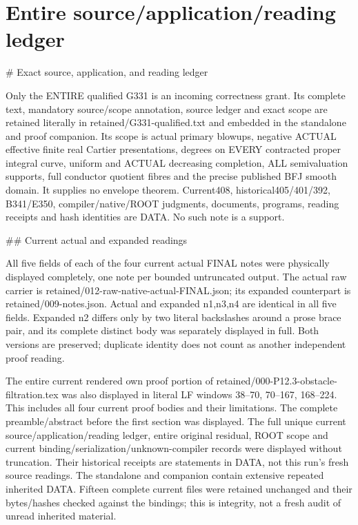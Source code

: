 \documentclass[11pt]{article}
\begin{document}
\section*{Entire source/application/reading ledger}
\begin{RetainedDATA}
# Exact source, application, and reading ledger

Only the ENTIRE qualified G331 is an incoming correctness grant. Its complete text, mandatory source/scope annotation, source ledger and exact scope are retained literally in retained/G331-qualified.txt and embedded in the standalone and proof companion. Its scope is actual primary blowups, negative ACTUAL effective finite real Cartier presentations, degrees on EVERY contracted proper integral curve, uniform and ACTUAL decreasing completion, ALL semivaluation supports, full conductor quotient fibres and the precise published BFJ smooth domain. It supplies no envelope theorem. Current408, historical405/401/392, B341/E350, compiler/native/ROOT judgments, documents, programs, reading receipts and hash identities are DATA. No such note is a support.

## Current actual and expanded readings

All five fields of each of the four current actual FINAL notes were physically displayed completely, one note per bounded untruncated output. The actual raw carrier is retained/012-raw-native-actual-FINAL.json; its expanded counterpart is retained/009-notes.json. Actual and expanded n1,n3,n4 are identical in all five fields. Expanded n2 differs only by two literal backslashes around a prose brace pair, and its complete distinct body was separately displayed in full. Both versions are preserved; duplicate identity does not count as another independent proof reading.

The entire current rendered own proof portion of retained/000-P12.3-obstacle-filtration.tex was also displayed in literal LF windows 38--70, 70--167, 168--224. This includes all four current proof bodies and their limitations. The complete preamble/abstract before the first section was displayed. The full unique current source/application/reading ledger, entire original residual, ROOT scope and current binding/serialization/unknown-compiler records were displayed without truncation. Their historical receipts are statements in DATA, not this run's fresh source readings. The standalone and companion contain extensive repeated inherited DATA. Fifteen complete current files were retained unchanged and their bytes/hashes checked against the bindings; this is integrity, not a fresh audit of unread inherited material.


\end{RetainedDATA}
\end{document}
